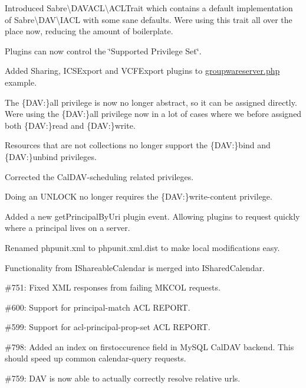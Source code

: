 \begin{DoxyItemize}
\item Introduced {\ttfamily Sabre\textbackslash{}D\+A\+V\+A\+CL\textbackslash{}A\+C\+L\+Trait} which contains a default implementation of {\ttfamily Sabre\textbackslash{}D\+AV\textbackslash{}I\+A\+CL} with some sane defaults. We\textquotesingle{}re using this trait all over the place now, reducing the amount of boilerplate.
\item Plugins can now control the \char`\"{}\+Supported Privilege Set\char`\"{}.
\item Added Sharing, I\+C\+S\+Export and V\+C\+F\+Export plugins to {\ttfamily \mbox{\hyperlink{groupwareserver_8php_source}{groupwareserver.\+php}}} example.
\item The {\ttfamily \{D\+AV\+:\}all} privilege is now no longer abstract, so it can be assigned directly. We\textquotesingle{}re using the {\ttfamily \{D\+AV\+:\}all} privilege now in a lot of cases where we before assigned both {\ttfamily \{D\+AV\+:\}read} and {\ttfamily \{D\+AV\+:\}write}.
\item Resources that are not collections no longer support the {\ttfamily \{D\+AV\+:\}bind} and {\ttfamily \{D\+AV\+:\}unbind} privileges.
\item Corrected the Cal\+D\+A\+V-\/scheduling related privileges.
\item Doing an {\ttfamily U\+N\+L\+O\+CK} no longer requires the {\ttfamily \{D\+AV\+:\}write-\/content} privilege.
\item Added a new {\ttfamily get\+Principal\+By\+Uri} plugin event. Allowing plugins to request quickly where a principal lives on a server.
\item Renamed {\ttfamily phpunit.\+xml} to {\ttfamily phpunit.\+xml.\+dist} to make local modifications easy.
\item Functionality from {\ttfamily I\+Shareable\+Calendar} is merged into {\ttfamily I\+Shared\+Calendar}.
\item \#751\+: Fixed X\+ML responses from failing {\ttfamily M\+K\+C\+OL} requests.
\item \#600\+: Support for {\ttfamily principal-\/match} A\+CL {\ttfamily R\+E\+P\+O\+RT}.
\item \#599\+: Support for {\ttfamily acl-\/principal-\/prop-\/set} A\+CL {\ttfamily R\+E\+P\+O\+RT}.
\item \#798\+: Added an index on {\ttfamily firstoccurence} field in My\+S\+QL Cal\+D\+AV backend. This should speed up common calendar-\/query requests.
\item \#759\+: D\+AV is now able to actually correctly resolve relative urls.

\end{DoxyItemize}
